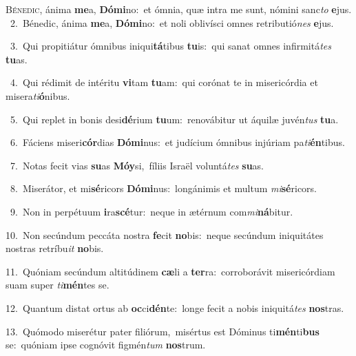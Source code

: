 \lettrine{\initial\textcolor{\initialcolor}{B}}{énedic,} ánima \textbf{me}\-a, \textbf{Dó}\-\textbf{mi}no:~\star et ómnia, quæ intra me sunt, nómini sanc\textit{to} \textbf{e}\-jus.\\
{\numbfont\textcolor{\numbcolor}{~2.}}~Bénedic, ánima \textbf{me}\-a, \textbf{Dó}\-\textbf{mi}no:~\star et noli oblivísci omnes retributió\textit{nes} \textbf{e}\-jus.\par
{\numbfont\textcolor{\numbcolor}{~3.}}~Qui propitiátur ómnibus iniqui\-\textbf{tá}\-tibus \textbf{tu}\-is:~\star qui sanat omnes infirmitá\textit{tes} \textbf{tu}\-as.\par
{\numbfont\textcolor{\numbcolor}{~4.}}~Qui rédimit de intéritu \textbf{vi}\-tam \textbf{tu}\-am:~\star qui corónat te in misericórdia et misera\-\textit{ti}\-\textbf{ó}nibus.\par
{\numbfont\textcolor{\numbcolor}{~5.}}~Qui replet in bonis desi\-\textbf{dé}\-rium \textbf{tu}\-um:~\star renovábitur ut áquilæ juvén\textit{tus} \textbf{tu}\-a.\par
{\numbfont\textcolor{\numbcolor}{~6.}}~Fáciens miseri\-\textbf{cór}\-dias \textbf{Dó}\-\textbf{mi}nus:~\star et judícium ómnibus injúriam pa\-\textit{ti}\-\textbf{én}tibus.\par
{\numbfont\textcolor{\numbcolor}{~7.}}~Notas fecit vias \textbf{su}\-as \textbf{Mó}\-\textbf{y}si,~\star fíliis Israël voluntá\textit{tes} \textbf{su}\-as.\par
{\numbfont\textcolor{\numbcolor}{~8.}}~Miserátor, et mi\-\textbf{sé}\-ricors \textbf{Dó}\-\textbf{mi}nus:~\star longánimis et multum \textit{mi}\-\textbf{sé}ricors.\par
{\numbfont\textcolor{\numbcolor}{~9.}}~Non in perpétuum \textbf{i}\-ra\-\textbf{scé}\-tur:~\star neque in ætérnum com\-\textit{mi}\-\textbf{ná}bitur.\par
{\numbfont\textcolor{\numbcolor}{10.}}~Non secúndum peccáta nostra \textbf{fe}\-cit \textbf{no}\-bis:~\star neque secúndum iniquitátes nostras retríbu\textit{it} \textbf{no}\-bis.\par
{\numbfont\textcolor{\numbcolor}{11.}}~Quóniam secúndum altitúdinem \textbf{cæ}\-li a \textbf{ter}\-ra:~\star corroborávit misericórdiam suam super \textit{ti}\-\textbf{mén}tes se.\par
{\numbfont\textcolor{\numbcolor}{12.}}~Quantum distat ortus ab \textbf{oc}\-ci\-\textbf{dén}\-te:~\star longe fecit a nobis iniquitá\textit{tes} \textbf{nos}\-tras.\par
{\numbfont\textcolor{\numbcolor}{13.}}~Quómodo miserétur pater filiórum,~\dagger misértus est Dóminus ti\-\textbf{mén}\-ti\textbf{bus} se:~\star quóniam ipse cognóvit figmén\textit{tum} \textbf{nos}\-trum.\par
